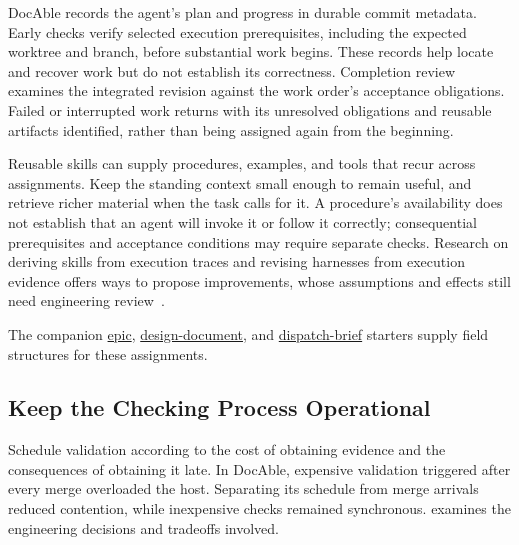 DocAble records the agent's plan and progress in durable commit metadata. Early checks verify selected execution prerequisites, including the expected worktree and branch, before substantial work begins. These records help locate and recover work but do not establish its correctness. Completion review examines the integrated revision against the work order's acceptance obligations. Failed or interrupted work returns with its unresolved obligations and reusable artifacts identified, rather than being assigned again from the beginning.


Reusable skills can supply procedures, examples, and tools that recur across assignments. Keep the standing context small enough to remain useful, and retrieve richer material when the task calls for it. A procedure's availability does not establish that an agent will invoke it or follow it correctly; consequential prerequisites and acceptance conditions may require separate checks. Research on deriving skills from execution traces and revising harnesses from execution evidence offers ways to propose improvements, whose assumptions and effects still need engineering review~\citep{ni2026trace2skill,chen2026harnessfix,lin2026agentic}.

The companion \href{https://davisjam.github.io/model-based-agentic-software-engineering/downloads/EPIC-TEMPLATE-starter.md}{epic}, \href{https://davisjam.github.io/model-based-agentic-software-engineering/downloads/design-doc-template-starter.md}{design-document}, and \href{https://davisjam.github.io/model-based-agentic-software-engineering/downloads/agent-brief-starter.md}{dispatch-brief} starters supply field structures for these assignments.

\subsection{Keep the Checking Process Operational}\label{heading:keep-the-checking-process-operational}

Schedule validation according to the cost of obtaining evidence and the consequences of obtaining it late. In DocAble, expensive validation triggered after every merge overloaded the host. Separating its schedule from merge arrivals reduced contention, while inexpensive checks remained synchronous.  examines the engineering decisions and tradeoffs involved.

